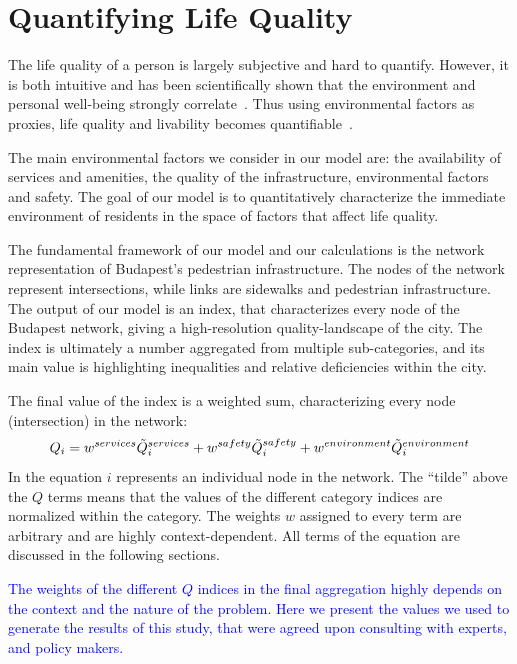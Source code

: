 \section{Quantifying Life Quality}
The life quality of a person is largely subjective and hard to quantify. However, it is both intuitive and has been scientifically shown that the environment and personal well-being strongly correlate~\cite{Rosow1961Social}. Thus using environmental factors as proxies, life quality and livability becomes quantifiable~\cite{Kahneman2006Developments}.

The main environmental factors we consider in our model are: the availability of services and amenities, the quality of the infrastructure, environmental factors and safety. The goal of our model is to quantitatively characterize the immediate environment of residents in the space of factors that affect life quality.

The fundamental framework of our model and our calculations is the network representation of Budapest’s pedestrian infrastructure. The nodes of the network represent intersections, while links are sidewalks and pedestrian infrastructure. The output of our model is an index, that characterizes every node of the Budapest network, giving a high-resolution quality-landscape of the city. The index is ultimately a number aggregated from multiple sub-categories, and its main value is highlighting inequalities and relative deficiencies within the city.

The final value of the index is a weighted sum, characterizing every node (intersection) in the network:
\begin{equation} \label{final_Q}
	Q_i =w^{services}\Tilde{Q}_i^{services} + w^{safety} \Tilde{Q}_i^{safety} + w^{environment}\Tilde{Q}_i^{environment}
\end{equation}
In the equation $i$ represents an individual node in the network. The ``tilde'' above the $Q$ terms means that the values of the different category indices are normalized within the category. The weights $w$ assigned to every term are arbitrary and are highly context-dependent. All terms of the equation are discussed in the following sections.

\textcolor{blue}{The weights of the different $Q$ indices in the final aggregation highly depends on the context and the nature of the problem. Here we present the values we used to generate the results of this study, that were agreed upon consulting with experts, and policy makers.}

